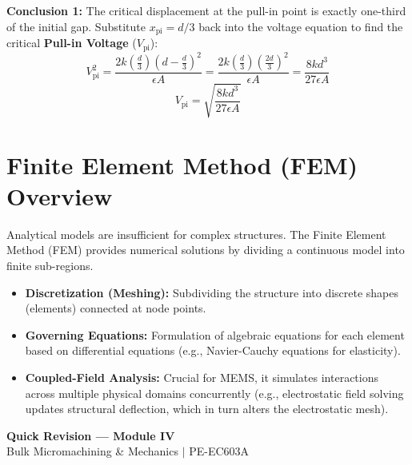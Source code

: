 \documentclass[12pt,a4paper]{article}
\begin{document}
\textbf{Conclusion 1:} The critical displacement at the pull-in point is exactly one-third of the initial gap.
Substitute $x_{\text{pi}} = d/3$ back into the voltage equation to find the critical \textbf{Pull-in Voltage} ($V_{\text{pi}}$):
$$V_{\text{pi}}^2 = \frac{2 k \left(\frac{d}{3}\right) \left(d - \frac{d}{3}\right)^2}{\epsilon A} = \frac{2 k \left(\frac{d}{3}\right) \left(\frac{2d}{3}\right)^2}{\epsilon A} = \frac{8 k d^3}{27 \epsilon A}$$
$$V_{\text{pi}} = \sqrt{\frac{8 k d^3}{27 \epsilon A}}$$

\section{Finite Element Method (FEM) Overview}

Analytical models are insufficient for complex structures. The Finite Element Method (FEM) provides numerical solutions by dividing a continuous model into finite sub-regions.
\begin{itemize}[leftmargin=*, itemsep=3.5pt]
  \item \textbf{Discretization (Meshing):} Subdividing the structure into discrete shapes (elements) connected at node points.
  \item \textbf{Governing Equations:} Formulation of algebraic equations for each element based on differential equations (e.g., Navier-Cauchy equations for elasticity).
  \item \textbf{Coupled-Field Analysis:} Crucial for MEMS, it simulates interactions across multiple physical domains concurrently (e.g., electrostatic field solving updates structural deflection, which in turn alters the electrostatic mesh).
\end{itemize}

\newpage
\begin{center}
  {\large\bfseries\color{myred} Quick Revision --- Module IV}\\[3pt]
  {\small\color{mydark} Bulk Micromachining \& Mechanics $|$ PE-EC603A}
\end{center}
\noindent{\color{myred}\rule{\linewidth}{1.2pt}}
\vspace{4pt}
\end{document}
